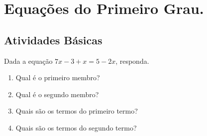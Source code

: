 \chapter{Equações do Primeiro Grau.} \label{cap1}
		\section{Atividades Básicas}				
							
				\item Dada a equação $7x-3+x=5-2x$, responda.
					\setlength{\columnsep}{5pt}%
					\begin{multicols}{2}					
					\begin{enumerate}
						\item Qual é o primeiro membro?
						\item Qual é o segundo membro?
						\item Quais são os termos do primeiro termo?
						\item Quais são os termos do segundo termo?
					\end{enumerate}
					\end{multicols}
						

